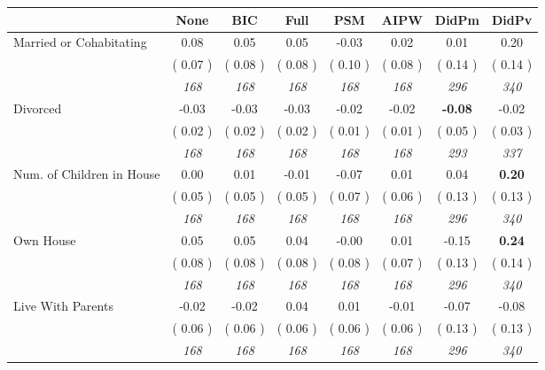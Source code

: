 \begin{tabular}{l c c c c c c c}
\toprule
 & None & BIC & Full & PSM & AIPW & DidPm & DidPv \\
\midrule
Married or Cohabitating &      0.08 &      0.05 &      0.05 &     -0.03 &      0.02 &      0.01 &      0.20 \\
& (     0.07 ) & (     0.08 ) & (     0.08 ) & (     0.10 ) & (     0.08 ) & (     0.14 ) & (     0.14 ) \\
& \textit{ 168 } & \textit{ 168 } & \textit{ 168 } & \textit{ 168 } & \textit{ 168 } & \textit{ 296 } & \textit{ 340 } \\
Divorced &     -0.03 &     -0.03 &     -0.03 &     -0.02 &     -0.02 & \textbf{     -0.08 } &     -0.02 \\
& (     0.02 ) & (     0.02 ) & (     0.02 ) & (     0.01 ) & (     0.01 ) & (     0.05 ) & (     0.03 ) \\
& \textit{ 168 } & \textit{ 168 } & \textit{ 168 } & \textit{ 168 } & \textit{ 168 } & \textit{ 293 } & \textit{ 337 } \\
Num. of Children in House &      0.00 &      0.01 &     -0.01 &     -0.07 &      0.01 &      0.04 & \textbf{      0.20 } \\
& (     0.05 ) & (     0.05 ) & (     0.05 ) & (     0.07 ) & (     0.06 ) & (     0.13 ) & (     0.13 ) \\
& \textit{ 168 } & \textit{ 168 } & \textit{ 168 } & \textit{ 168 } & \textit{ 168 } & \textit{ 296 } & \textit{ 340 } \\
Own House &      0.05 &      0.05 &      0.04 &     -0.00 &      0.01 &     -0.15 & \textbf{      0.24 } \\
& (     0.08 ) & (     0.08 ) & (     0.08 ) & (     0.08 ) & (     0.07 ) & (     0.13 ) & (     0.14 ) \\
& \textit{ 168 } & \textit{ 168 } & \textit{ 168 } & \textit{ 168 } & \textit{ 168 } & \textit{ 296 } & \textit{ 340 } \\
Live With Parents &     -0.02 &     -0.02 &      0.04 &      0.01 &     -0.01 &     -0.07 &     -0.08 \\
& (     0.06 ) & (     0.06 ) & (     0.06 ) & (     0.06 ) & (     0.06 ) & (     0.13 ) & (     0.13 ) \\
& \textit{ 168 } & \textit{ 168 } & \textit{ 168 } & \textit{ 168 } & \textit{ 168 } & \textit{ 296 } & \textit{ 340 } \\
\bottomrule
\end{tabular}
